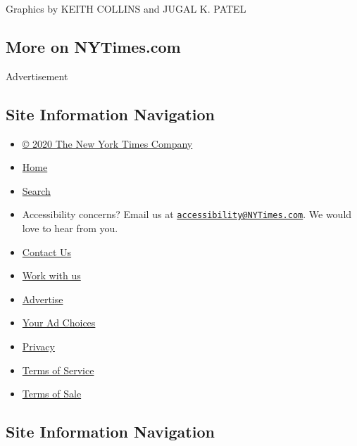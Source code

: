 Graphics by KEITH COLLINS and JUGAL K. PATEL

\hypertarget{more-on-nytimescom}{%
\subsection{More on NYTimes.com}\label{more-on-nytimescom}}

Advertisement

\hypertarget{site-information-navigation}{%
\subsection{Site Information
Navigation}\label{site-information-navigation}}

\begin{itemize}
\tightlist
\item
  \href{https://help.nytimes3xbfgragh.onion/hc/en-us/articles/115014792127-Copyright-notice}{©
  2020 The New York Times Company}
\item
  \href{https://www.nytimes3xbfgragh.onion}{Home}
\item
  \href{https://www.nytimes3xbfgragh.onion/search/}{Search}
\item
  Accessibility concerns? Email us at
  \href{mailto:accessibility@NYTimes.com}{\nolinkurl{accessibility@NYTimes.com}}.
  We would love to hear from you.
\item
  \href{https://help.nytimes3xbfgragh.onion/hc/en-us/articles/115015385887-Contact-Us}{Contact
  Us}
\item
  \href{https://www.nytco.com/careers/}{Work with us}
\item
  \href{https://nytmediakit.com/}{Advertise}
\item
  \href{https://help.nytimes3xbfgragh.onion/hc/en-us/articles/115014892108-Privacy-policy\#pp}{Your
  Ad Choices}
\item
  \href{https://help.nytimes3xbfgragh.onion/hc/en-us/articles/115014892108-Privacy-policy}{Privacy}
\item
  \href{https://help.nytimes3xbfgragh.onion/hc/en-us/articles/115014893428-Terms-of-service}{Terms
  of Service}
\item
  \href{https://help.nytimes3xbfgragh.onion/hc/en-us/articles/115014893968-Terms-of-sale}{Terms
  of Sale}
\end{itemize}

\hypertarget{site-information-navigation-1}{%
\subsection{Site Information
Navigation}\label{site-information-navigation-1}}

